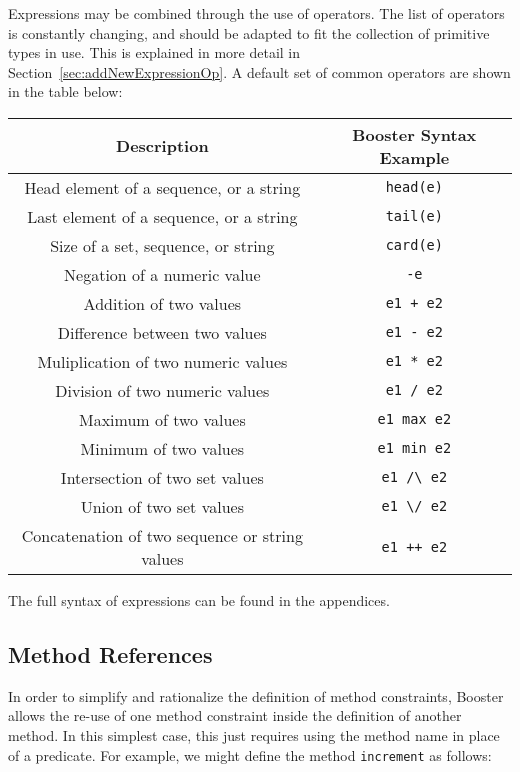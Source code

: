 Expressions may be combined through the use of operators.  The list of
operators is constantly changing, and should be adapted to fit the
collection of primitive types in use.  This is explained in more
detail in Section~\ref{sec:addNewExpressionOp}. A default set of
common operators are shown in the table below:
\begin{center}
  \begin{tabular} { | c | c | } 
  \hline
  \textbf{Description} & \textbf{Booster Syntax Example} \\ \hline
  Head element of a sequence, or a string & \verb|head(e)| \\ \hline
  Last element of a sequence, or a string & \verb|tail(e)| \\ \hline
  Size of a set, sequence, or string & \verb|card(e)| \\ \hline
  Negation of a numeric value & \verb| -e | \\ \hline
  Addition of two values & \verb| e1 + e2 | \\ \hline
  Difference between two values & \verb| e1 - e2 | \\ \hline 
  Muliplication of two numeric values & \verb| e1 * e2 | \\ \hline 
  Division of two numeric values & \verb| e1 / e2 | \\ \hline 
  Maximum of two values & \verb| e1 max e2 | \\ \hline 
  Minimum of two values & \verb| e1 min e2 | \\ \hline 
  Intersection of two set values & \verb| e1 /\ e2 | \\ \hline 
  Union of two set values & \verb| e1 \/ e2 | \\ \hline 
  Concatenation of two sequence or string values & \verb| e1 ++ e2 | \\ \hline 
 \end{tabular}
\end{center}

The full syntax of expressions can be found in the appendices.


\subsection{Method References}

In order to simplify and rationalize the definition of method
constraints, Booster allows the re-use of one method constraint inside
the definition of another method.  In this simplest case, this just
requires using the method name in place of a predicate.  For example,
we might define the method \verb|increment| as follows:

